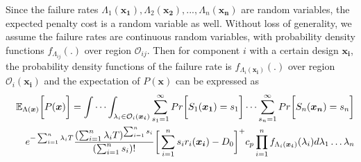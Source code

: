 \documentclass[preprint,12pt]{elsarticle}
\begin{document}
Since the failure rates $\Lambda_{1}(\boldsymbol{x_{1}}),\Lambda_{2}(\boldsymbol{x_{2}}),...,\Lambda_{n}(\boldsymbol{x_{n}})$ are random variables, the expected penalty cost is a random variable as well. Without loss of generality, we assume the failure rates are continuous random variables, with probability density functions $f_{\Lambda_{ij}}(.)$ over region $\mathcal{O}_{ij}$. Then for component $i$ with a certain design $\boldsymbol{x_{i}}$, the probability density functions of the failure rate is $f_{\Lambda_{i}(\boldsymbol{x_{i}})}(.)$ over region $\mathcal{O}_{i}(\boldsymbol{x_{i}})$ and the expectation of $P(\boldsymbol{x})$ can be expressed as
\begin{eqnarray}
&& \mathbb{E}_{\Lambda(\boldsymbol{x})} \bigg[ P(\boldsymbol{x}) \bigg]=
\idotsint_{\lambda_{i} \in \mathcal{O}_{i}(\boldsymbol{x_i})} \sum_{s_{1}=1}^{\infty}{ Pr\bigg[S_{1}(\boldsymbol{x_{1}})=s_{1}\bigg]}\dots\sum_{s_{n}=1} ^{\infty}{Pr\bigg[S_{n}(\boldsymbol{x_{n}})=s_{n}\bigg]}\nonumber\\
 &&e^{-\sum_{i=1}^{n}{\lambda_{i}T}}
 \frac{(\sum_{i=1}^{n}{\lambda_{i}T}) ^{\sum_{i=1}^{n}{s_{i}}}}{(\sum_{i=1}^{n}{s_{i}})!} \bigg[\sum_{i=1}^{n}{s_{i}r_{i}(\boldsymbol{x_{i}})}-D_{0}\bigg]^{+}c_{p}\prod_{i=1}^{n}{f_{\Lambda_{i}(\boldsymbol{x_{i}})}(\lambda_{i})d\lambda_{1}\dots\lambda_{n}} \nonumber
\end{eqnarray}
\end{document}

